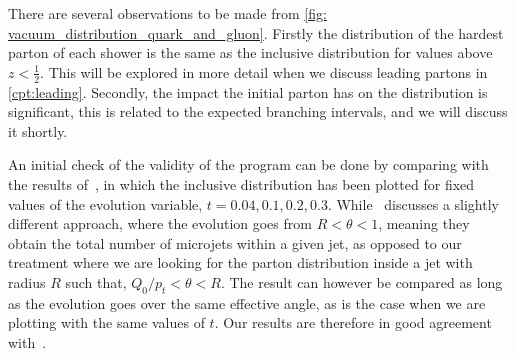 \documentclass[main.tex]{subfiles}
\begin{document}
There are several observations to be made from \autoref{fig: vacuum_distribution_quark_and_gluon}. Firstly the distribution of the hardest parton of each shower is the same as the inclusive distribution for values above \(z<\frac{1}{2}\). This will be explored in more detail when we discuss leading partons in \autoref{cpt:leading}. Secondly, the impact the initial parton has on the distribution is significant, this is related to the expected branching intervals, and we will discuss it shortly.

An initial check of the validity of the program can be done by comparing with the results of~\cite[Figure 2.]{Dasgupta_2015}, in which the inclusive distribution has been plotted for fixed values of the evolution variable, \(t=0.04, 0.1, 0.2, 0.3\). While~\cite{Dasgupta_2015} discusses a slightly different approach, where the evolution goes from \(R<\theta<1\), meaning they obtain the total number of microjets within a given jet, as opposed to our treatment where we are looking for the parton distribution inside a jet with radius \(R\) such that, \(Q_0/p_t < \theta < R\). The result can however be compared as long as the evolution goes over the same effective angle, as is the case when we are plotting with the same values of \(t\). Our results are therefore in good agreement with~\cite{Dasgupta_2015}.
\end{document}
